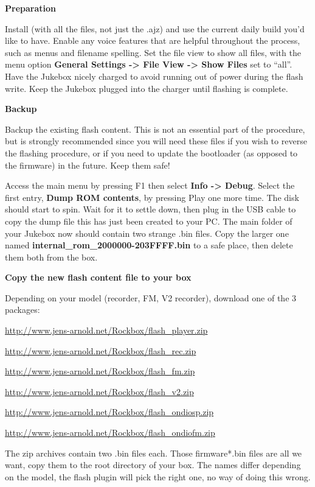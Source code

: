 \textbf{Preparation}

Install (with all the files, not just the .ajz) and use the current
daily build you'd like to have. Enable any voice
features that are helpful throughout the process, such as menus and
filename spelling. Set the file view to show all files, with  the menu
option \textbf{General Settings {}-{\textgreater} File View
{}-{\textgreater} Show Files} set to ``all''.
Have the Jukebox nicely charged to avoid
running out of power during the flash write.  Keep the Jukebox plugged
into the charger until flashing is complete.

{\bfseries
Backup }

Backup the existing flash content.  This is not an essential part of the
procedure, but is strongly recommended since you will need these files
if you wish to reverse the flashing procedure, or if you need to update
the bootloader (as opposed to the firmware) in the future.  Keep them
safe!

Access the main menu by pressing F1 then select \textbf{Info
{}-{\textgreater} Debug}.  Select the first entry, \textbf{Dump ROM
contents}, by pressing Play one more time. The disk should start to
spin. Wait for it to settle down, then plug in the USB cable  to copy
the dump file this has just been created to your PC. The main folder of
your Jukebox now should contain two strange .bin files. Copy the larger
one named
\textbf{internal\_rom\_2000000{}-203FFFF.bin}
to a safe place, then delete them both from the box. 

{\bfseries
Copy the new flash content file to your box }

Depending on your model (recorder, FM, V2 recorder), download one of the
3 packages: 

\url{http://www.jens-arnold.net/Rockbox/flash_player.zip}

\url{http://www.jens-arnold.net/Rockbox/flash_rec.zip}

\url{http://www.jens-arnold.net/Rockbox/flash_fm.zip}

\url{http://www.jens-arnold.net/Rockbox/flash_v2.zip}

\url{http://www.jens-arnold.net/Rockbox/flash_ondiosp.zip}

\url{http://www.jens-arnold.net/Rockbox/flash_ondiofm.zip}

The zip archives contain two .bin files each. Those firmware*.bin files
are all we want, copy them to the root directory of your box. The names
differ depending on the model, the flash
plugin will pick the right one, no way of
doing this wrong. 

